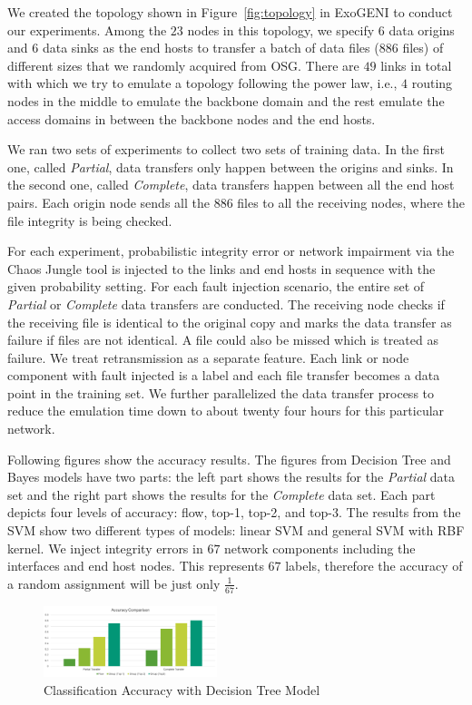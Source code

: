 We created the topology shown in Figure~\ref{fig:topology} in ExoGENI to conduct our experiments. Among the $23$ nodes in this topology, we specify $6$ data origins and $6$ data sinks as the end hosts to transfer a batch of data files ($886$ files) of different sizes that we randomly acquired from OSG. There are $49$ links in total with which we try to emulate a topology following the power law, i.e., $4$ routing nodes in the middle to emulate the backbone domain and the rest emulate the access domains in between the backbone nodes and the end hosts. 

We ran two sets of experiments to collect two sets of training data. In the first one, called {\it Partial},
data transfers only happen between the origins and sinks. In the second one, called {\it Complete}, 
data transfers happen between all the end host pairs. Each origin node sends all the $886$ files to all the receiving nodes, where the file integrity is being checked.

For each experiment, probabilistic integrity error or network impairment via the Chaos Jungle tool is injected to the links and end hosts in sequence with the given probability setting. For each fault injection scenario, the entire set of {\it Partial} or  {\it Complete} data transfers are conducted. The receiving node checks if the receiving file is identical to the original copy and marks the data transfer as failure if files are not identical. A file could also be missed which is treated as failure. We treat retransmission as a separate feature. Each link or node component with fault injected is a label and each file transfer becomes a data point in the training set. We further parallelized the data transfer process to reduce the emulation time down to about twenty four hours for this particular network. 

Following figures show the accuracy results. The figures from Decision Tree and Bayes models have two parts: the left part shows the results for the {\it Partial} data set and the right part shows the results for the {\it Complete} data set. Each part depicts four levels of accuracy: flow, top-1, top-2, and top-3. The results from the SVM show two different types of models: linear SVM and general SVM with RBF kernel.
We inject integrity errors in $67$ network components including the interfaces and end host nodes. This represents $67$ labels, therefore the accuracy of a random assignment will be just only $\frac{1}{67}$.

\begin{figure}[!ht]
\begin{center}
\includegraphics[width=0.45\textwidth]{./figure/dt-result}
\end{center}
\caption{Classification Accuracy with Decision Tree Model}
\label{fig:dt}
\end{figure}

